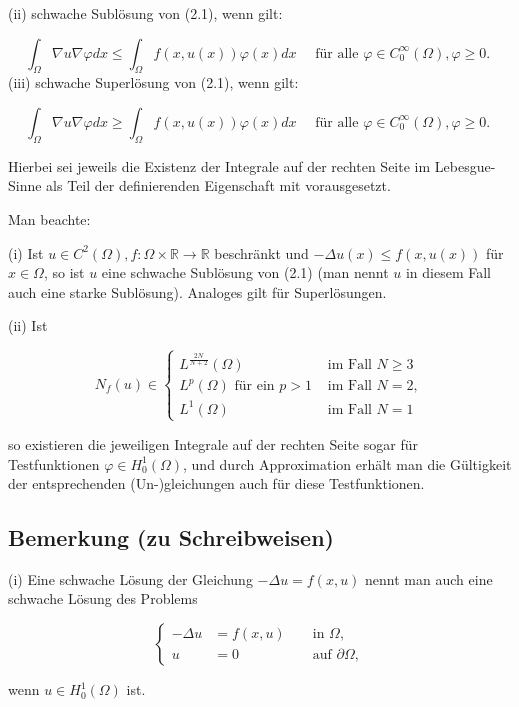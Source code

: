 \documentclass[10pt, letterpaper]{article}
\begin{document}
(ii) schwache Sublösung von (2.1), wenn gilt:

$$
\int_{\Omega} \nabla u \nabla \varphi d x \leq \int_{\Omega} f(x, u(x)) \varphi(x) d x \quad \text { für alle } \varphi \in C_{0}^{\infty}(\Omega), \varphi \geq 0 \text {. }
$$
(iii) schwache Superlösung von (2.1), wenn gilt:

$$
\int_{\Omega} \nabla u \nabla \varphi d x \geq \int_{\Omega} f(x, u(x)) \varphi(x) d x \quad \text { für alle } \varphi \in C_{0}^{\infty}(\Omega), \varphi \geq 0 \text {. }
$$

Hierbei sei jeweils die Existenz der Integrale auf der rechten Seite im Lebesgue-Sinne als Teil der definierenden Eigenschaft mit vorausgesetzt.

Man beachte:

(i) Ist $u \in C^{2}(\Omega), f: \Omega \times \mathbb{R} \rightarrow \mathbb{R}$ beschränkt und $-\Delta u(x) \leq f(x, u(x))$ für $x \in \Omega$, so ist $u$ eine schwache Sublösung von (2.1) (man nennt $u$ in diesem Fall auch eine starke Sublösung). Analoges gilt für Superlösungen.

(ii) Ist

$$
N_{f}(u) \in \begin{cases}L^{\frac{2 N}{N+2}}(\Omega) & \text { im Fall } N \geq 3 \\ L^{p}(\Omega) \text { für ein } p>1 & \text { im Fall } N=2, \\ L^{1}(\Omega) & \text { im Fall } N=1\end{cases}
$$

so existieren die jeweiligen Integrale auf der rechten Seite sogar für Testfunktionen $\varphi \in H_{0}^{1}(\Omega)$, und durch Approximation erhält man die Gültigkeit der entsprechenden (Un-)gleichungen auch für diese Testfunktionen.

\subsection*{Bemerkung (zu Schreibweisen)}

(i) Eine schwache Lösung der Gleichung $-\Delta u=f(x, u)$ nennt man auch eine schwache Lösung des Problems

$$
\left\{\begin{aligned}
-\Delta u & =f(x, u) & & \text { in } \Omega, \\
u & =0 & & \text { auf } \partial \Omega,
\end{aligned}\right.
$$

wenn $u \in H_{0}^{1}(\Omega)$ ist.
\end{document}
